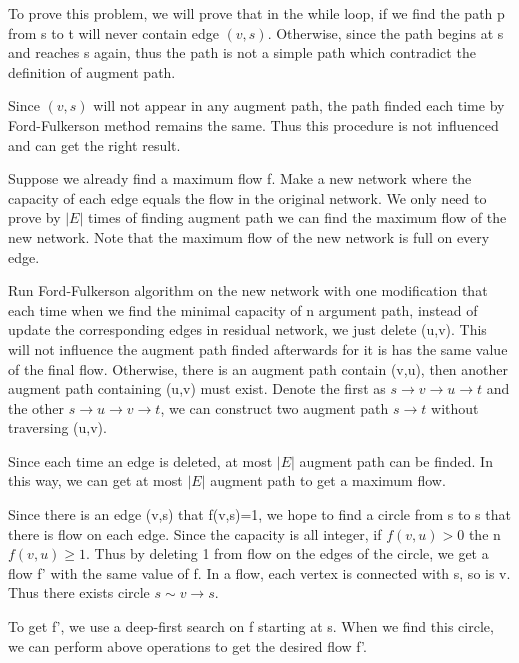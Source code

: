 \begin{psproblem}[26.2.8]
\end{psproblem}
\begin{pssolution}
    To prove this problem, we will prove that in the while loop, if we find the path p from s to t will never contain edge $(v,s)$. Otherwise, since the path begins at s and reaches s again, thus the path is not a simple path which contradict the definition of augment path.

    Since $(v,s)$ will not appear in any augment path, the path finded each time by Ford-Fulkerson method remains the same. Thus this procedure is not influenced and can get the right result.

\end{pssolution}

\begin{psproblem}[26.2.10]
\end{psproblem}
\begin{pssolution}
    Suppose we already find a maximum flow f. Make a new network where the capacity of each edge equals the flow in the original network. We only need to prove by $|E|$ times of finding augment path we can find the maximum flow of the new network. Note that the maximum flow of the new network is full on every edge.

    Run Ford-Fulkerson algorithm on the new network with one modification that each time when we find the minimal capacity of n argument path, instead of update the corresponding edges in residual network, we just delete (u,v). This will not influence the augment path finded afterwards for it is has the same value of the final flow. Otherwise, there is an augment path contain (v,u), then another augment path containing (u,v) must exist. Denote the first as $s\rightarrow v\rightarrow u \rightarrow t$ and the other $s\rightarrow u\rightarrow v\rightarrow t$, we can construct two augment path $s\rightarrow t$ without traversing (u,v).

    Since each time an edge is deleted, at most $|E|$ augment path can be finded. In this way, we can get at most $|E|$ augment path to get a maximum flow.
\end{pssolution}

\begin{psproblem}[26.2.12]
\end{psproblem}
\begin{pssolution}
    Since there is an edge (v,s) that f(v,s)=1, we hope to find a circle from s to s that there is flow on each edge. Since the capacity is all integer, if $f(v,u)>0$ the n$f(v,u)\geq 1$. Thus by deleting 1 from flow on the edges of the circle, we get a flow f' with the same value of f. In a flow, each vertex is connected with s, so is v. Thus there exists circle $s\sim v\rightarrow s$.

    To get f', we use a deep-first search on f starting at s. When we find this circle, we can perform above operations to get the desired flow f'.
\end{pssolution}

